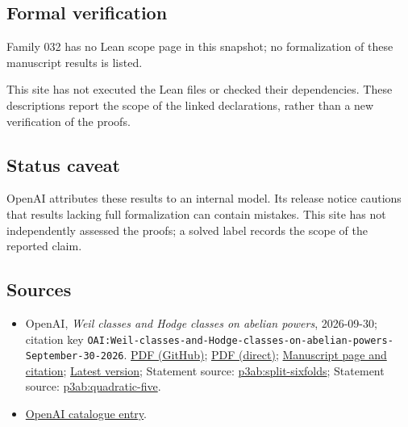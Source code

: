 \documentclass[11pt]{article}
\begin{document}
\subsection{Formal verification}
Family 032 has no Lean scope page in this snapshot; no formalization of these manuscript results is listed.

This site has not executed the Lean files or checked their dependencies. These descriptions report the scope of the linked declarations, rather than a new verification of the proofs.

\subsection{Status caveat}
OpenAI attributes these results to an internal model. Its release notice cautions that results lacking full formalization can contain mistakes. This site has not independently assessed the proofs; a solved label records the scope of the reported claim.

\subsection{Sources}
\begin{itemize}
\item OpenAI, \emph{Weil classes and Hodge classes on abelian powers}, 2026-09-30; citation key \texttt{OAI:Weil-classes-and-Hodge-classes-on-abelian-powers-September-30-2026}. \href{https://github.com/openai/math/blob/adc7f1241b42e322a6451854ab7e4b4c146bf78a/preprints/Weil-classes-and-Hodge-classes-on-abelian-powers-September-30-2026/paper.pdf}{PDF (GitHub)}; \href{https://github.com/openai/math/raw/adc7f1241b42e322a6451854ab7e4b4c146bf78a/preprints/Weil-classes-and-Hodge-classes-on-abelian-powers-September-30-2026/paper.pdf}{PDF (direct)}; \href{https://github.com/openai/math/blob/adc7f1241b42e322a6451854ab7e4b4c146bf78a/preprints/Weil-classes-and-Hodge-classes-on-abelian-powers-September-30-2026/README.md}{Manuscript page and citation}; \href{https://github.com/openai/math/blob/main/preprints/Weil-classes-and-Hodge-classes-on-abelian-powers-September-30-2026/paper.pdf}{Latest version}; Statement source: \href{https://github.com/openai/math/blob/adc7f1241b42e322a6451854ab7e4b4c146bf78a/preprints/Weil-classes-and-Hodge-classes-on-abelian-powers-September-30-2026/build/paper.tex\#L79}{p3ab:split-sixfolds}; Statement source: \href{https://github.com/openai/math/blob/adc7f1241b42e322a6451854ab7e4b4c146bf78a/preprints/Weil-classes-and-Hodge-classes-on-abelian-powers-September-30-2026/build/paper.tex\#L88}{p3ab:quadratic-five}.
\item \href{https://github.com/openai/math/blob/adc7f1241b42e322a6451854ab7e4b4c146bf78a/CONTENTS.md}{OpenAI catalogue entry}.
\end{itemize}
\end{document}
